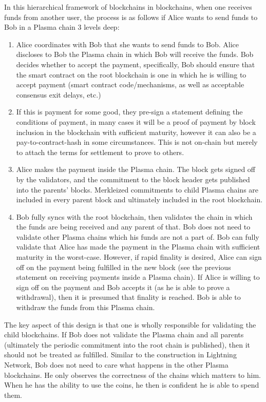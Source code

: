 \documentclass[letterpaper, 11pt]{article}
\begin{document}
In this hierarchical framework of blockchains in blockchains, when one receives
funds from another user, the process is as follows if Alice wants to send funds
to Bob in a Plasma chain 3 levels deep:
\begin{enumerate}
	\item
		Alice coordinates with Bob that she wants to send funds to Bob.
		Alice discloses to Bob the Plasma chain in which Bob will
		receive the funds. Bob decides whether to accept the payment,
		specifically, Bob should ensure that the smart contract on the
		root blockchain is one in which he is willing to accept payment
		(smart contract code/mechanisms, as well as acceptable consensus
		exit delays, etc.)
	\item
		If this is payment for some good, they pre-sign a statement
		defining the conditions of payment, in many cases it will be a
		proof of payment by block inclusion in the blockchain with
		sufficient maturity, however it can also be a
		pay-to-contract-hash in some circumstances. This is not on-chain
		but merely to attach the terms for settlement to prove to
		others.
	\item
		Alice makes the payment inside the Plasma chain. The block gets
		signed off by the validators, and the commitment to the block
		header gets published into the parents' blocks. Merkleized
		commitments to child Plasma chains are included in every parent
		block and ultimately included in the root blockchain.
	\item
		Bob fully syncs with the root blockchain, then validates the
		chain in which the funds are being received and any parent of
		that. Bob does not need to validate other Plasma chains which
		his funds are not a part of. Bob can fully validate that Alice
		has made the payment in the Plasma chain with sufficient
		maturity in the worst-case. However, if rapid finality is
		desired, Alice can sign off on the payment being fulfilled in
		the new block (see the previous statement on receiving payments
		inside a Plasma chain). If Alice is willing to sign off on
		the payment and Bob accepts it (as he is able to prove a
		withdrawal), then it is presumed that finality is reached. Bob
		is able to withdraw the funds from this Plasma chain.
\end{enumerate}

The key aspect of this design is that one is wholly responsible for validating
the child blockchains. If Bob does not validate the Plasma chain and all parents
(ultimately the periodic commitment into the root chain is published), then it
should not be treated as fulfilled. Similar to the construction in Lightning
Network, Bob does not need to care what happens in the other Plasma blockchains.
He only observes the correctness of the chains which matters to him. When he has
the ability to use the coins, he then is confident he is able to spend them.
\end{document}
